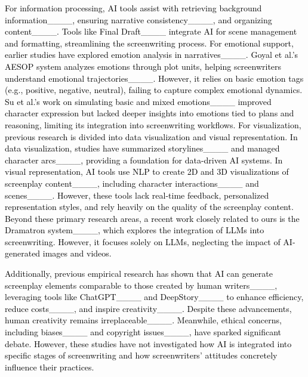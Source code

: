 \textcolor{black}{For information processing, AI tools assist with retrieving background information____, ensuring narrative consistency____, and organizing content____. Tools like Final Draft____ integrate AI for scene management and formatting, streamlining the screenwriting process. For emotional support, earlier studies have explored emotion analysis in narratives____. Goyal et al.'s AESOP system analyzes emotions through plot units, helping screenwriters understand emotional trajectories____. However, it relies on basic emotion tags (e.g., positive, negative, neutral), failing to capture complex emotional dynamics. Su et al.'s work on simulating basic and mixed emotions____ improved character expression but lacked deeper insights into emotions tied to plans and reasoning, limiting its integration into screenwriting workflows. For visualization, previous research is divided into data visualization and visual representation. In data visualization, studies have summarized storylines____ and managed character arcs____, providing a foundation for data-driven AI systems. In visual representation, AI tools use NLP to create 2D and 3D visualizations of screenplay content____, including character interactions____ and scenes____. However, these tools lack real-time feedback, personalized representation styles, and rely heavily on the quality of the screenplay content. Beyond these primary research areas, a recent work closely related to ours is the Dramatron system____, which explores the integration of LLMs into screenwriting. However, it focuses solely on LLMs, neglecting the impact of AI-generated images and videos.}

\textcolor{black}{Additionally, previous empirical research has shown that AI can generate screenplay elements comparable to those created by human writers____, leveraging tools like ChatGPT____ and DeepStory____ to enhance efficiency, reduce costs____, and inspire creativity____. Despite these advancements, human creativity remains irreplaceable____. Meanwhile, ethical concerns, including biases____ and copyright issues____, have sparked significant debate. However, these studies have not investigated how AI is integrated into specific stages of screenwriting and how screenwriters' attitudes concretely influence their practices.}



